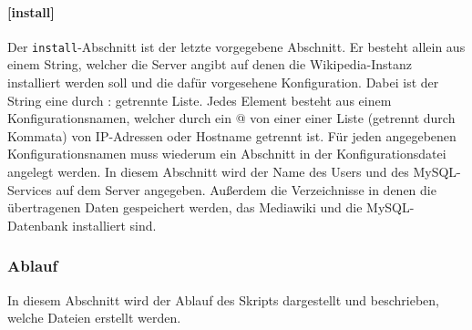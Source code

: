 \paragraph{[install]}

Der \texttt{install}-Abschnitt ist der letzte vorgegebene Abschnitt. Er besteht allein aus einem String, welcher die Server angibt auf denen die Wikipedia-Instanz installiert werden soll und die dafür vorgesehene Konfiguration. Dabei ist der String eine durch \glqq{}:\grqq{} getrennte Liste. Jedes Element besteht aus einem Konfigurationsnamen, welcher durch ein \glqq{}@\grqq{} von einer einer Liste (getrennt durch Kommata) von IP-Adressen oder Hostname getrennt ist. Für jeden angegebenen Konfigurationsnamen muss wiederum ein Abschnitt in der Konfigurationsdatei angelegt werden. 
In diesem Abschnitt wird der Name des Users und des MySQL-Services auf dem Server angegeben. Außerdem die Verzeichnisse in denen die übertragenen Daten gespeichert werden, das Mediawiki und die MySQL-Datenbank installiert sind.

\subsubsection{Ablauf}
\label{sec:ablauf}
In diesem Abschnitt wird der Ablauf des Skripts dargestellt und beschrieben, welche Dateien erstellt werden.

